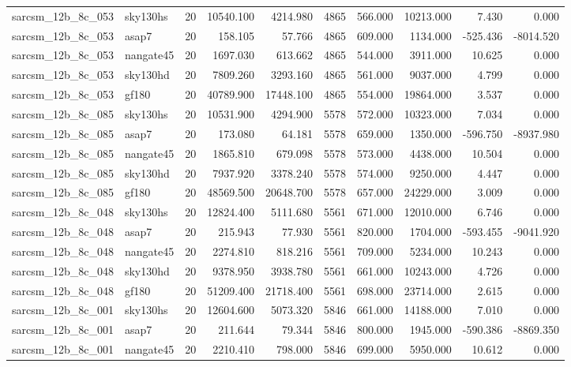 \begin{longtable}{llrrrrrrrr}
sarcsm\_12b\_8c\_053 & sky130hs & 20 & 10540.100 & 4214.980 & 4865 & 566.000 & 10213.000 & 7.430 & 0.000 \\
sarcsm\_12b\_8c\_053 & asap7 & 20 & 158.105 & 57.766 & 4865 & 609.000 & 1134.000 & -525.436 & -8014.520 \\
sarcsm\_12b\_8c\_053 & nangate45 & 20 & 1697.030 & 613.662 & 4865 & 544.000 & 3911.000 & 10.625 & 0.000 \\
sarcsm\_12b\_8c\_053 & sky130hd & 20 & 7809.260 & 3293.160 & 4865 & 561.000 & 9037.000 & 4.799 & 0.000 \\
sarcsm\_12b\_8c\_053 & gf180 & 20 & 40789.900 & 17448.100 & 4865 & 554.000 & 19864.000 & 3.537 & 0.000 \\
sarcsm\_12b\_8c\_085 & sky130hs & 20 & 10531.900 & 4294.900 & 5578 & 572.000 & 10323.000 & 7.034 & 0.000 \\
sarcsm\_12b\_8c\_085 & asap7 & 20 & 173.080 & 64.181 & 5578 & 659.000 & 1350.000 & -596.750 & -8937.980 \\
sarcsm\_12b\_8c\_085 & nangate45 & 20 & 1865.810 & 679.098 & 5578 & 573.000 & 4438.000 & 10.504 & 0.000 \\
sarcsm\_12b\_8c\_085 & sky130hd & 20 & 7937.920 & 3378.240 & 5578 & 574.000 & 9250.000 & 4.447 & 0.000 \\
sarcsm\_12b\_8c\_085 & gf180 & 20 & 48569.500 & 20648.700 & 5578 & 657.000 & 24229.000 & 3.009 & 0.000 \\
sarcsm\_12b\_8c\_048 & sky130hs & 20 & 12824.400 & 5111.680 & 5561 & 671.000 & 12010.000 & 6.746 & 0.000 \\
sarcsm\_12b\_8c\_048 & asap7 & 20 & 215.943 & 77.930 & 5561 & 820.000 & 1704.000 & -593.455 & -9041.920 \\
sarcsm\_12b\_8c\_048 & nangate45 & 20 & 2274.810 & 818.216 & 5561 & 709.000 & 5234.000 & 10.243 & 0.000 \\
sarcsm\_12b\_8c\_048 & sky130hd & 20 & 9378.950 & 3938.780 & 5561 & 661.000 & 10243.000 & 4.726 & 0.000 \\
sarcsm\_12b\_8c\_048 & gf180 & 20 & 51209.400 & 21718.400 & 5561 & 698.000 & 23714.000 & 2.615 & 0.000 \\
sarcsm\_12b\_8c\_001 & sky130hs & 20 & 12604.600 & 5073.320 & 5846 & 661.000 & 14188.000 & 7.010 & 0.000 \\
sarcsm\_12b\_8c\_001 & asap7 & 20 & 211.644 & 79.344 & 5846 & 800.000 & 1945.000 & -590.386 & -8869.350 \\
sarcsm\_12b\_8c\_001 & nangate45 & 20 & 2210.410 & 798.000 & 5846 & 699.000 & 5950.000 & 10.612 & 0.000 \\

\end{longtable}

